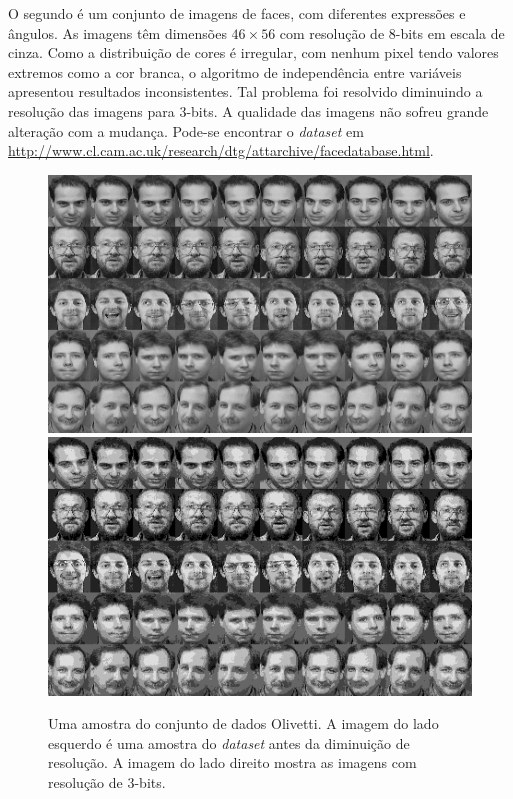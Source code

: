 \documentclass[12pt]{article}
\theoremstyle{plain}
\numberwithin{equation}{section}
\begin{document}
O segundo é um conjunto de imagens de faces, com diferentes expressões e ângulos. As imagens têm
dimensões $46\times 56$ com resolução de 8-bits em escala de cinza. Como a distribuição de cores é
irregular, com nenhum pixel tendo valores extremos como a cor branca, o algoritmo de independência
entre variáveis apresentou resultados inconsistentes. Tal problema foi resolvido diminuindo a
resolução das imagens para 3-bits. A qualidade das imagens não sofreu grande alteração com a
mudança. Pode-se encontrar o \textit{dataset} em
\url{http://www.cl.cam.ac.uk/research/dtg/attarchive/facedatabase.html}.

\begin{figure}[h]
  \centering\includegraphics[scale=0.5]{imgs/olivetti_sample.png}
  \includegraphics[scale=0.5]{imgs/olivetti-8_sample.png}
  \captionsetup{justification=raggedright}
  \caption{Uma amostra do conjunto de dados Olivetti. A imagem do lado esquerdo é uma amostra do
  \textit{dataset} antes da diminuição de resolução. A imagem do lado direito mostra as imagens com
  resolução de 3-bits.}
\end{figure}
\end{document}
